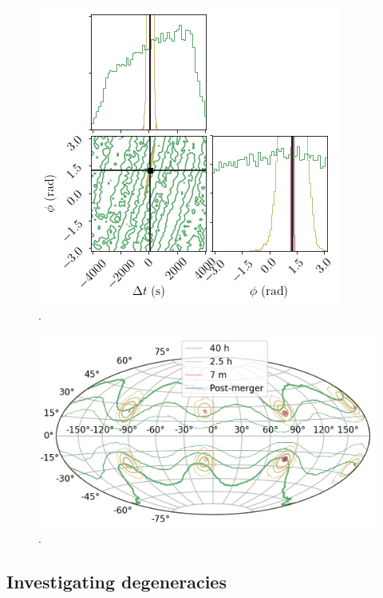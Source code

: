 \documentclass[aps,showpacs,twocolumn,prd,superscriptaddress,nofootinbib]{revtex4-1}
\begin{document}
\begin{figure}
\begin{minipage}{.32\linewidth}
   \end{minipage}
   \begin{minipage}{.32\linewidth}
      \includegraphics[width=.99\linewidth]{../plots/corner_smbh_case9_hm_tseries_tphi.png}
   \end{minipage}
  \caption{.}
  \label{fig:smbhCornerZoomHMCase9}
\end{figure}

\begin{figure}
  \centering
  \includegraphics[width=.8\linewidth]{../plots/plot_mollweide_tseries.png}
  \caption{.}
  \label{fig:MollweidesmbhTserieshmCase9}
\end{figure}


\subsection{Investigating degeneracies}
\label{subsec:SMBHPEdegen}
\end{document}
